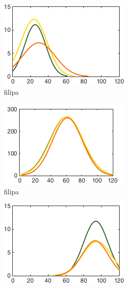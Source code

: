 \begin{figure}[h]
        \centering
        \begin{subfigure}[h]{0.32\textwidth}
                \includegraphics[width=\textwidth]{./img/4/ADEhard}
                \caption{filipa}
                \label{fig:ADEhard}
        \end{subfigure}
        \begin{subfigure}[h]{0.32\textwidth}
                \includegraphics[width=\textwidth]{./img/4/ADEmedium}
                \caption{filipa}
                \label{fig:ADEmedium}
        \end{subfigure}
        \begin{subfigure}[h]{0.32\textwidth}
                \includegraphics[width=\textwidth]{./img/4/ADEeasy}

\end{subfigure}
\end{figure}
